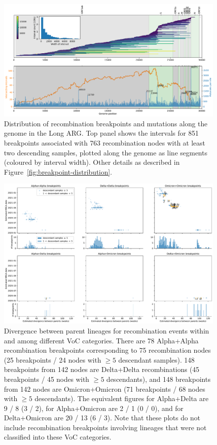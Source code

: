 \documentclass{article}
\begin{document}
\begin{figure}
\centering
\includegraphics[width=\textwidth]{figures/long_arg_recombination_intervals.pdf}
\caption{\label{fig:long_arg_breakpoint_distribution}
Distribution of recombination breakpoints and mutations along the genome in
the Long ARG.
Top panel shows the intervals for 851 breakpoints associated
with 763 recombination nodes with at least two descending samples, plotted along the genome
as line segments (coloured by interval width).
Other details as described in Figure~\ref{fig:breakpoint-distribution}.}
\end{figure}


\begin{figure} \centering
\includegraphics[width=\textwidth]{figures/supp_recombination_node_mrcas.pdf}
\caption{\label{fig:recomb_mrcas_voc_breakdown}  Divergence between parent
lineages for recombination events within and among different VoC categories.
There are 78 Alpha+Alpha recombination breakpoints corresponding to 75 recombination nodes
(25 breakpoints / 24 nodes with $\geq5$ descendant samples).
148 breakpoints from 142 nodes are Delta+Delta recombinations (45 breakpoints / 45 nodes with  $\geq5$ descendants),
and 148 breakpoints from 142 nodes are Omicron+Omicron (71 breakpoints / 68 nodes with $\geq5$ descendants).
The equivalent figures for Alpha+Delta are 9 / 8 (3 / 2),
for Alpha+Omicron are 2 / 1 (0 / 0),
and for Delta+Omicron are 20 / 13 (6 / 3).
Note that these plots do not include recombination breakpoints involving lineages that were not classified into these VoC categories.
}
\end{figure}
\end{document}
